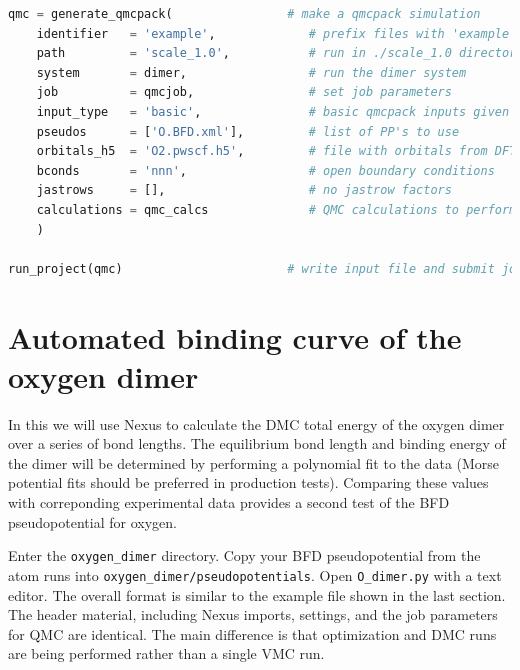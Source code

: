 \begin{lstlisting}[language=Python]
qmc = generate_qmcpack(                # make a qmcpack simulation 
    identifier   = 'example',             # prefix files with 'example'
    path         = 'scale_1.0',           # run in ./scale_1.0 directory
    system       = dimer,                 # run the dimer system
    job          = qmcjob,                # set job parameters
    input_type   = 'basic',               # basic qmcpack inputs given below    
    pseudos      = ['O.BFD.xml'],         # list of PP's to use
    orbitals_h5  = 'O2.pwscf.h5',         # file with orbitals from DFT
    bconds       = 'nnn',                 # open boundary conditions
    jastrows     = [],                    # no jastrow factors
    calculations = qmc_calcs              # QMC calculations to perform
    )
                       
run_project(qmc)                       # write input file and submit job
\end{lstlisting}



\section{Automated binding curve of the oxygen dimer}
\label{sec:dimer_automation}
In this we will use Nexus to calculate the DMC total energy of the oxygen dimer over a series of bond lengths.  The equilibrium bond length and binding energy of the dimer will be determined by performing a polynomial fit to the data (Morse potential fits should be preferred in production tests).  Comparing these values with correponding experimental data provides a second test of the BFD pseudopotential for oxygen.

Enter the \texttt{oxygen\_dimer} directory.  Copy your BFD pseudopotential from the atom runs into \texttt{oxygen\_dimer/pseudopotentials}.  Open \texttt{O\_dimer.py} with a text editor.  The overall format is similar to the example file shown in the last section.  The header material, including Nexus imports, settings, and the job parameters for QMC are identical.  The main difference is that optimization and DMC runs are being performed rather than a single VMC run.  

